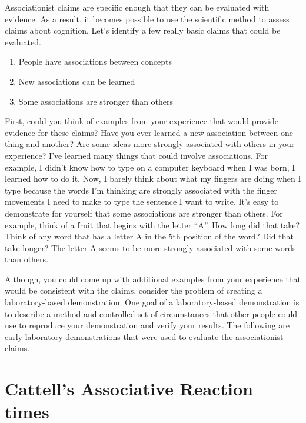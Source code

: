 \documentclass[
  oneside,
  12pt]{crumpbook}
\providecommand{\tightlist}{%
  \setlength{\itemsep}{0pt}\setlength{\parskip}{0pt}}
\begin{document}
Associationist claims are specific enough that they can be evaluated with evidence. As a result, it becomes possible to use the scientific method to assess claims about cognition. Let's identify a few really basic claims that could be evaluated.

\begin{enumerate}
\def\labelenumi{\arabic{enumi}.}
\tightlist
\item
  People have associations between concepts
\item
  New associations can be learned
\item
  Some associations are stronger than others
\end{enumerate}

First, could you think of examples from your experience that would provide evidence for these claims? Have you ever learned a new association between one thing and another? Are some ideas more strongly associated with others in your experience? I've learned many things that could involve associations. For example, I didn't know how to type on a computer keyboard when I was born, I learned how to do it. Now, I barely think about what my fingers are doing when I type because the words I'm thinking are strongly associated with the finger movements I need to make to type the sentence I want to write. It's easy to demonstrate for yourself that some associations are stronger than others. For example, think of a fruit that begins with the letter ``A''. How long did that take? Think of any word that has a letter A in the 5th position of the word? Did that take longer? The letter A seems to be more strongly associated with some words than others.

Although, you could come up with additional examples from your experience that would be consistent with the claims, consider the problem of creating a laboratory-based demonstration. One goal of a laboratory-based demonstration is to describe a method and controlled set of circumstances that other people could use to reproduce your demonstration and verify your results. The following are early laboratory demonstrations that were used to evaluate the associationist claims.

\hypertarget{cattells-associative-reaction-times}{%
\section{Cattell's Associative Reaction times}\label{cattells-associative-reaction-times}}
\end{document}
